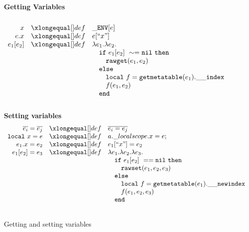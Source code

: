 \begin{figure}[P]
\caption{Getting and setting variables}
{\bf Getting Variables}
\label{fig:getandset}
\[
\begin{array}{rclcl}
\\
\desugar{x}{{\tt \_ENV}[e]}
\desugar{e.x}{e[``x"]}
\desugar{e_1[e_2]}{{\lambda}e_1.{\lambda}e_2.}   
\desugarline{
    \quad{\tt if}~ e_1[e_2] ~\sim= {\tt nil} ~ {\tt then}\\
    \quad\quad{\tt rawget}(e_1, e_2) ~\\
    \quad{\tt else}\\
    \quad\quad{\tt local}~f = {\tt getmetatable}(e_1).{\tt{\_}{\_}index}~\\
    \quad\quad f(e_1,e_2)\\ 
    \quad{\tt end}
}
\\
\end{array}
\]
{\bf Setting variables}
\[
\begin{array}{rclcl}
\desugar{
     \overline{e_i}=\overline{e_j}
}{   
     \overline{e_i = e_j}
}
\desugar{
     {\tt local}~x=e
}{   
  a.\_localscope.x = e;
}
\desugar{e_1.x=e_2}{e_1[``x"] = e_2}
\desugar{e_1[e_2]=e_3}{{\lambda}e_1.{\lambda}e_2.{\lambda}e_3.}
\desugarline{
    \quad{\tt if}~ e_1[e_2] ~== {\tt nil} ~ {\tt then}\\
    \quad\quad{\tt rawset}(e_1, e_2,e_3) ~\\
    \quad{\tt else}\\
    \quad\quad{\tt local}~f = {\tt getmetatable}(e_1).{\tt{\_}{\_}newindex}~\\
    \quad\quad f(e_1,e_2,e_3)\\ 
    \quad{\tt end}
}
\\
\end{array}
\]
\end{figure}

